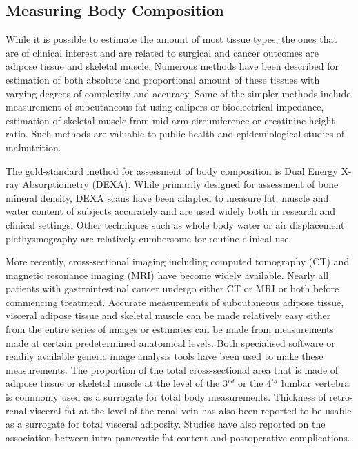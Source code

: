 \subsection{Measuring Body Composition}
While it is possible to estimate the amount of most tissue types, the ones that are of clinical interest and are related to surgical and cancer outcomes are adipose tissue and skeletal muscle. Numerous methods have been described for estimation of both absolute and proportional amount of these tissues with varying degrees of complexity and accuracy. Some of the simpler methods include measurement of subcutaneous fat using calipers or bioelectrical impedance, estimation of skeletal muscle from mid-arm circumference or creatinine height ratio. Such methods are valuable to public health and epidemiological studies of malnutrition. 

The gold-standard method for assessment of body composition is Dual Energy X-ray Absorptiometry (DEXA).\parencite{haarbo_validation_1991} While primarily designed for assessment of bone mineral density, DEXA scans have been adapted to measure fat, muscle and water content of subjects accurately and are used widely both in research and clinical settings. Other techniques such as whole body water or air displacement plethysmography are relatively cumbersome for routine clinical use.

More recently, cross-sectional imaging including computed tomography (CT) and magnetic resonance imaging (MRI) have become widely available. Nearly all patients with gastrointestinal cancer undergo either CT or MRI or both before commencing treatment. Accurate measurements of subcutaneous adipose tissue, visceral adipose tissue and skeletal muscle can be made relatively easy either from the entire series of images or estimates can be made from measurements made at certain predetermined anatomical levels. Both specialised software or readily available generic image analysis tools have been used to make these measurements. The proportion of the total cross-sectional area that is made of adipose tissue or skeletal muscle at the level of the 3$^{rd}$  or the 4$^{th}$ lumbar vertebra is commonly used as a surrogate for total body measurements. Thickness of retro-renal visceral fat at the level of the renal vein has also been reported to be usable as a surrogate for total visceral adiposity. Studies have also reported on the association between intra-pancreatic fat content and postoperative complications.









